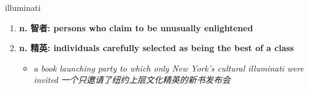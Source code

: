 
\begin{frame}
{\huge illuminati}
\begin{center}
\begin{enumerate}\Large
  \item \textbf{n. 智者: persons who claim to be unusually enlightened}
  \item \textbf{n. 精英: individuals carefully selected as being the best of a class}
  \begin{itemize}
    \item \em{\Large{a book launching party to which only New York's cultural illuminati were invited 一个只邀请了纽约上层文化精英的新书发布会}}
  \end{itemize}
\end{enumerate}
\end{center}
\end{frame}
